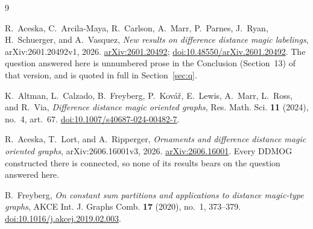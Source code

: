 \documentclass[11pt]{amsart}
\begin{document}
\begin{thebibliography}{9}

R.~Aceska, C.~Arcila-Maya, R.~Carlson, A.~Marr, P.~Parnes, J.~Ryan, H.~Schuerger, and
A.~Vasquez,
\emph{New results on difference distance magic labelings},
arXiv:2601.20492v1, 2026.
\href{https://arxiv.org/abs/2601.20492}{arXiv:2601.20492};
\href{https://doi.org/10.48550/arXiv.2601.20492}{doi:10.48550/arXiv.2601.20492}.
The question answered here is unnumbered prose in the Conclusion (Section~13) of that version,
and is quoted in full in Section~\ref{sec:q}.

K.~Altman, L.~Calzado, B.~Freyberg, P.~Kov\'a\v{r}, E.~Lewis, A.~Marr, L.~Ross, and R.~Via,
\emph{Difference distance magic oriented graphs},
Res. Math. Sci. \textbf{11} (2024), no.~4, art.~67.
\href{https://doi.org/10.1007/s40687-024-00482-7}{doi:10.1007/s40687-024-00482-7}.

R.~Aceska, T.~Lort, and A.~Ripperger,
\emph{Ornaments and difference distance magic oriented graphs},
arXiv:2606.16001v3, 2026.
\href{https://arxiv.org/abs/2606.16001}{arXiv:2606.16001}.
Every DDMOG constructed there is connected, so none of its results bears on the question
answered here.

B.~Freyberg,
\emph{On constant sum partitions and applications to distance magic-type graphs},
AKCE Int. J. Graphs Comb. \textbf{17} (2020), no.~1, 373--379.
\href{https://doi.org/10.1016/j.akcej.2019.02.003}{doi:10.1016/j.akcej.2019.02.003}.

\end{thebibliography}
\end{document}
